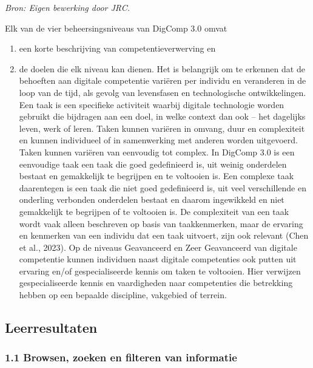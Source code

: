 \documentclass[
  dutch,
  letterpaper,
  DIV=11,
  numbers=noendperiod]{scrartcl}
\begin{document}
\emph{Bron: Eigen bewerking door JRC.}

Elk van de vier beheersingsniveaus van DigComp 3.0 omvat

\begin{enumerate}
\def\labelenumi{\arabic{enumi}.}
\item
  een korte beschrijving van competentieverwerving en
\item
  de doelen die elk niveau kan dienen. Het is belangrijk om te erkennen
  dat de behoeften aan digitale competentie variëren per individu en
  veranderen in de loop van de tijd, als gevolg van levensfasen en
  technologische ontwikkelingen. Een taak is een specifieke activiteit
  waarbij digitale technologie worden gebruikt die bijdragen aan een
  doel, in welke context dan ook -- het dagelijks leven, werk of leren.
  Taken kunnen variëren in omvang, duur en complexiteit en kunnen
  individueel of in samenwerking met anderen worden uitgevoerd. Taken
  kunnen variëren van eenvoudig tot complex. In DigComp 3.0 is een
  eenvoudige taak een taak die goed gedefinieerd is, uit weinig
  onderdelen bestaat en gemakkelijk te begrijpen en te voltooien is. Een
  complexe taak daarentegen is een taak die niet goed gedefinieerd is,
  uit veel verschillende en onderling verbonden onderdelen bestaat en
  daarom ingewikkeld en niet gemakkelijk te begrijpen of te voltooien
  is. De complexiteit van een taak wordt vaak alleen beschreven op basis
  van taakkenmerken, maar de ervaring en kenmerken van een individu dat
  een taak uitvoert, zijn ook relevant (Chen et al., 2023). Op de
  niveaus Geavanceerd en Zeer Geavanceerd van digitale competentie
  kunnen individuen naast digitale competenties ook putten uit ervaring
  en/of gespecialiseerde kennis om taken te voltooien. Hier verwijzen
  gespecialiseerde kennis en vaardigheden naar competenties die
  betrekking hebben op een bepaalde discipline, vakgebied of terrein.
\end{enumerate}

\newpage{}

\subsection{Leerresultaten}\label{sec-leerresultaten}

\subsubsection{1.1 Browsen, zoeken en filteren van
informatie}\label{browsen-zoeken-en-filteren-van-informatie}
\end{document}
